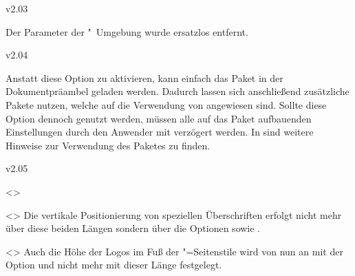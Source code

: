 \begin{Entity}{}
\begin{NoIndexDefault}
\begin{Cessations}{v2.03}
\begin{Declaration*}
  {}
\begin{Cessation}
  {}
\printdeclarationlist
%
Der Parameter  der 
"~Umgebung wurde ersatzlos entfernt.
\end{Cessation}
\end{Declaration*}
\end{Cessations}



\begin{Cessations}{v2.04}
\begin{Cessation}
  {}
\printdeclarationlist
%
Anstatt diese Option zu aktivieren, kann einfach das Paket  
in der Dokumentpräambel geladen werden. Dadurch lassen sich anschließend 
zusätzliche Pakete nutzen, welche auf die Verwendung von  
angewiesen sind. Sollte diese Option dennoch genutzt werden, müssen alle auf 
das Paket  aufbauenden Einstellungen durch den Anwender mit 
 verzögert werden. In 
 sind weitere Hinweise zur Verwendung des Paketes 
 zu finden.
\end{Cessation}
\end{Cessations}



\begin{Cessations}{v2.05}
\begin{Cessation}
  {}
  <>
\begin{Cessation}
  {}
  <>
\printdeclarationlist
%
Die vertikale Positionierung von speziellen Überschriften erfolgt nicht mehr 
über diese beiden Längen sondern über die Optionen  
sowie .
\end{Cessation}
\end{Cessation}


\begin{Cessation}
  {}
  <>
\printdeclarationlist
%
Auch die Höhe der Logos im Fuß der "=Seitenstile wird 
von nun an mit der Option  und nicht mehr mit dieser 
Länge festgelegt.
\end{Cessation}
\end{Cessations}




\end{NoIndexDefault}
\end{Entity}
